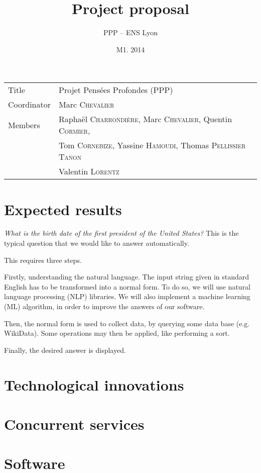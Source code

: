 \documentclass[a4paper,10pt]{article}
\title{Project proposal}
\author{PPP \--- ENS Lyon}
\date{M1. 2014}
\begin{document}
\maketitle

\begin{tabular}{|ll|}
\hline
Title & Projet Pensées Profondes (PPP)\\
Coordinator & Marc \textsc{Chevalier}\\
Members & Raphaël \textsc{Charrondière}, Marc \textsc{Chevalier}, Quentin \textsc{Cormier}, \\
        & Tom \textsc{Cornebize}, Yassine \textsc{Hamoudi}, Thomas \textsc{Pellissier} \textsc{Tanon}\\
        & Valentin \textsc{Lorentz}\\
\hline
\end{tabular}

\section{Expected results}
\emph{What is the birth date of the first president of the United States?} This is
the typical question that we would like to answer automatically.

This requires three steps. 

Firstly, understanding the natural language. The input string given in standard 
English has to be transformed into a normal form. To do so, we will use natural 
language processing (NLP) libraries. We will also implement a machine learning (ML)
algorithm, in order to improve the answers of our software.

Then, the normal form is used to collect data, by querying some data base (e.g.
WikiData). Some operations may then be applied, like performing a sort.

Finally, the desired answer is displayed.


\section{Technological innovations}

\section{Concurrent services}

\section{Software}
\end{document}
